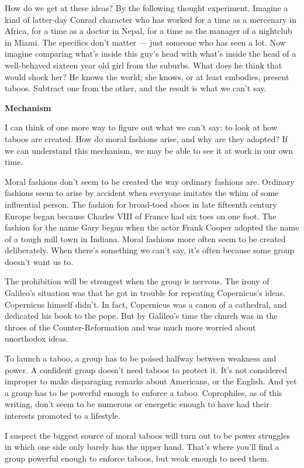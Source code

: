 How do we get at these ideas? By the following thought experiment.
Imagine a kind of latter-day Conrad character who has worked for a time
as a mercenary in Africa, for a time as a doctor in Nepal, for a time as
the manager of a nightclub in Miami. The specifics don't matter --- just
someone who has seen a lot. Now imagine comparing what's inside this
guy's head with what's inside the head of a well-behaved sixteen year
old girl from the suburbs. What does he think that would shock her? He
knows the world; she knows, or at least embodies, present taboos.
Subtract one from the other, and the result is what we can't say.

\textbf{Mechanism}

I can think of one more way to figure out what we can't say: to look at
how taboos are created. How do moral fashions arise, and why are they
adopted? If we can understand this mechanism, we may be able to see it
at work in our own time.

Moral fashions don't seem to be created the way ordinary fashions are.
Ordinary fashions seem to arise by accident when everyone imitates the
whim of some influential person. The fashion for broad-toed shoes in
late fifteenth century Europe began because Charles VIII of France had
six toes on one foot. The fashion for the name Gary began when the actor
Frank Cooper adopted the name of a tough mill town in Indiana. Moral
fashions more often seem to be created deliberately. When there's
something we can't say, it's often because some group doesn't want us
to.

The prohibition will be strongest when the group is nervous. The irony
of Galileo's situation was that he got in trouble for repeating
Copernicus's ideas. Copernicus himself didn't. In fact, Copernicus was a
canon of a cathedral, and dedicated his book to the pope. But by
Galileo's time the church was in the throes of the Counter-Reformation
and was much more worried about unorthodox ideas.

To launch a taboo, a group has to be poised halfway between weakness and
power. A confident group doesn't need taboos to protect it. It's not
considered improper to make disparaging remarks about Americans, or the
English. And yet a group has to be powerful enough to enforce a taboo.
Coprophiles, as of this writing, don't seem to be numerous or energetic
enough to have had their interests promoted to a lifestyle.

I suspect the biggest source of moral taboos will turn out to be power
struggles in which one side only barely has the upper hand. That's where
you'll find a group powerful enough to enforce taboos, but weak enough
to need them.

